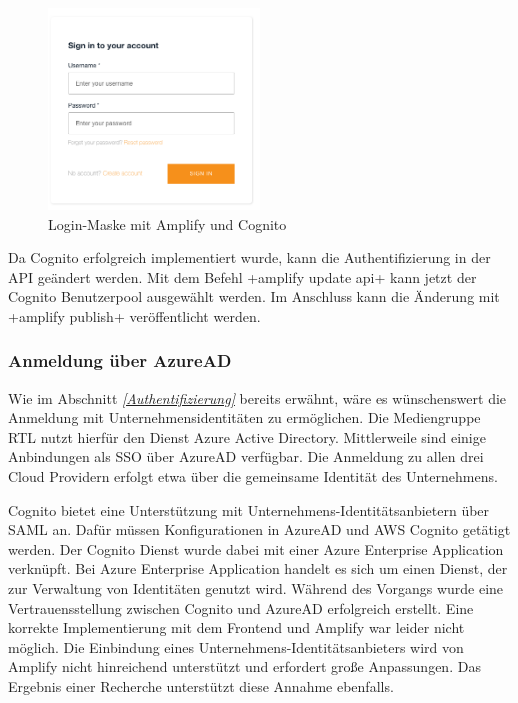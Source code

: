 \begin{figure}[htbp]
    \centering
    \includegraphics[width=0.5\textwidth]{50-Implementierung/Login.png}
    \caption{Login-Maske mit Amplify und Cognito}
    \label{fig:meine-grafik}
\end{figure}


Da Cognito erfolgreich implementiert wurde, kann die Authentifizierung in der API geändert werden.
Mit dem Befehl \spverb+amplify update api+ kann jetzt der Cognito Benutzerpool ausgewählt werden.
Im Anschluss kann die Änderung mit \spverb+amplify publish+ veröffentlicht werden.

\clearpage
\subsubsection{Anmeldung über AzureAD}

Wie im Abschnitt \textit{\ref{Authentifizierung} } bereits erwähnt, wäre es wünschenswert die Anmeldung mit Unternehmensidentitäten zu ermöglichen.
Die Mediengruppe RTL nutzt hierfür den Dienst Azure Active Directory.
Mittlerweile sind einige Anbindungen als SSO über AzureAD verfügbar.
Die Anmeldung zu allen drei Cloud Providern erfolgt etwa über die gemeinsame Identität des Unternehmens.

Cognito bietet eine Unterstützung mit Unternehmens-Identitätsanbietern über SAML an.
Dafür müssen Konfigurationen in AzureAD und AWS Cognito getätigt werden.
Der Cognito Dienst wurde dabei mit einer \glqq Azure Enterprise Application\grqq{} verknüpft.
Bei \glqq Azure Enterprise Application\grqq{} handelt es sich um einen Dienst, der zur Verwaltung von Identitäten genutzt wird.
Während des Vorgangs wurde eine Vertrauensstellung zwischen Cognito und AzureAD erfolgreich erstellt.
Eine korrekte Implementierung mit dem Frontend und Amplify war leider nicht möglich.
Die Einbindung eines Unternehmens-Identitätsanbieters wird von Amplify nicht hinreichend unterstützt und erfordert große Anpassungen.
Das Ergebnis einer Recherche unterstützt diese Annahme ebenfalls.

